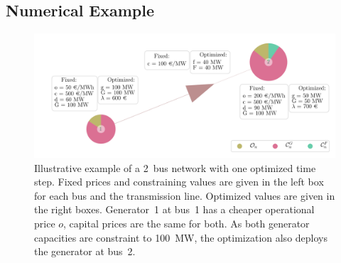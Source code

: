 \documentclass[11pt,twocolumn]{article}
\begin{document}
\subsection{Numerical Example}
\label{sec:numerical_example}
% 
\begin{figure}[t]
    \centering
    \includegraphics[width=\linewidth]{example_network.png}
    \caption{Illustrative example of a 2~bus network with one optimized time step. Fixed prices and constraining values are given in the left box for each bus and the transmission line. Optimized values are given in the right boxes. Generator~1 at bus~1 has a cheaper operational price $o$, capital prices are the same for both. As both generator capacities are constraint to 100~MW, the optimization also deploys the generator at bus~2. }
    \label{fig:example_network}
\end{figure}
\end{document}
